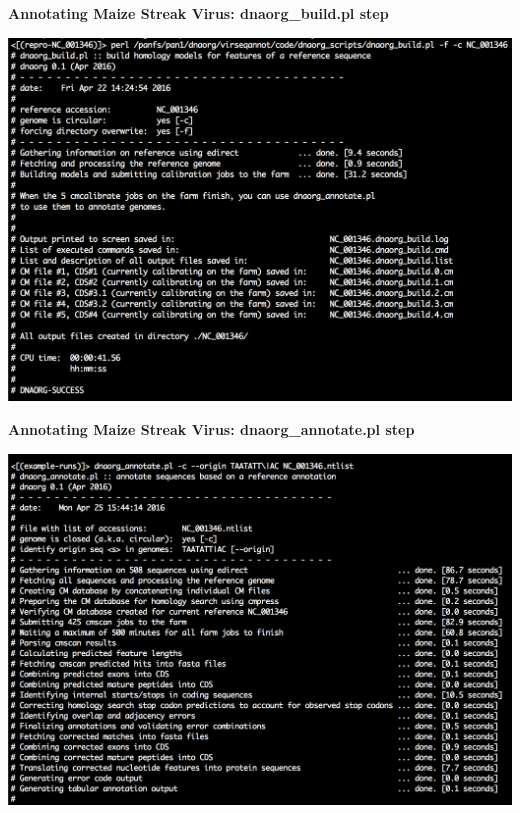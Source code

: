 \documentclass[landscape]{slides}
\begin{document}
\begin{slide}
\begin{center}
\textbf{Annotating Maize Streak Virus: dnaorg\_build.pl step} 

\includegraphics[width=8in]{figs/dnaorg-build-output}

\end{center}
\vfill
\end{slide}
\begin{slide}
\begin{center}
\textbf{Annotating Maize Streak Virus: dnaorg\_annotate.pl step} 

\includegraphics[width=8in]{figs/dnaorg-annotate-output1}

\end{center}
\vfill
\end{slide}
\end{document}
